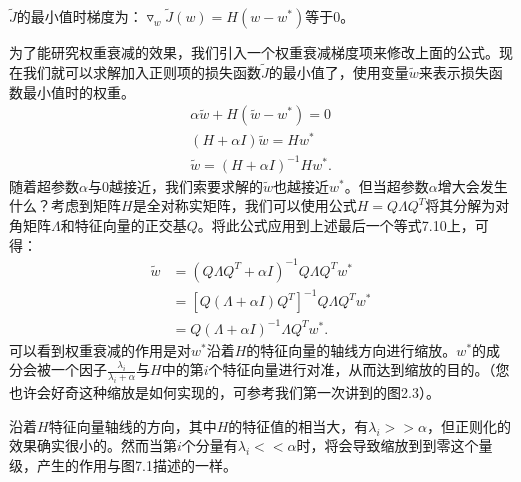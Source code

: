 $\widetilde{J}$的最小值时梯度为：$\triangledown_w \widetilde{J}(w) = H (w - w^*) $等于$0$。

为了能研究权重衰减的效果，我们引入一个权重衰减梯度项来修改上面的公式。现在我们就可以求解加入正则项的损失函数$\widetilde{J}$的最小值了，使用变量$\widetilde{w}$来表示损失函数最小值时的权重。
$$
\begin{aligned}
\alpha \widetilde{w} + H (\widetilde{w} - w^*) = 0 \\
(H + \alpha I) \widetilde{w} = H w^* \\
\widetilde{w} = (H + \alpha I)^{-1} H w^*.
\end{aligned}
$$
随着超参数$\alpha$与$0$越接近，我们索要求解的$\widetilde{w}$也越接近$w^*$。但当超参数$\alpha$增大会发生什么？考虑到矩阵$H$是全对称实矩阵，我们可以使用公式$H = Q \Lambda Q^T$将其分解为对角矩阵$\Lambda$和特征向量的正交基$Q$。将此公式应用到上述最后一个等式7.10上，可得：
$$
\begin{aligned}
\widetilde{w} & = (Q \Lambda Q^T + \alpha I)^{-1} Q \Lambda Q^T w^* \\
& = \left [ Q (\Lambda + \alpha I ) Q^T \right ]^{-1} Q \Lambda Q^T w^* \\
& = Q(\Lambda + \alpha I)^{-1} \Lambda Q^T w^*.
\end{aligned}
$$
可以看到权重衰减的作用是对$w^*$沿着$H$的特征向量的轴线方向进行缩放。$w^*$的成分会被一个因子$\frac{\lambda _i}{\lambda_i + \alpha}$与$H$中的第$i$个特征向量进行对准，从而达到缩放的目的。（您也许会好奇这种缩放是如何实现的，可参考我们第一次讲到的图2.3）。

沿着$H$特征向量轴线的方向，其中$H$的特征值的相当大，有$\lambda_i >> \alpha$，但正则化的效果确实很小的。然而当第$i$个分量有$\lambda_i << \alpha$时，将会导致缩放到到零这个量级，产生的作用与图7.1描述的一样。

